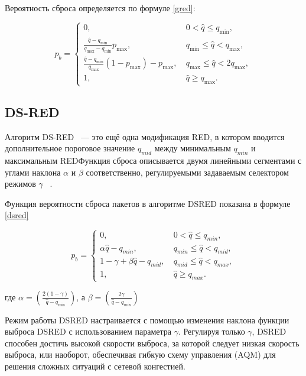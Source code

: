 Вероятность сброса определяется по формуле \eqref{gred}:

\begin{equation}
\label{gred}
p_{b} =\begin{cases}
        0, &  \  0 < \hat{q} \leqslant q_{\min}, 
        \\
        \frac{\hat{q} - q_{\min}}{q_{\max} - q_{\min}} p_{\max}, & \ q_{\min} \leqslant \hat{q} < q_{\max}, 
        \\
        \frac{\hat{q} - q_{\min}}{q_{\max}}(1-p_{\max}) - p_{\max}, & \ q_{\max} \leqslant \hat{q} < 2q_{\max}, 
        \\
        1, &  \ \hat{q} \geqslant  q_{\max}.
\end{cases}
\end{equation}


\subsection{DS-RED}

Алгоритм DS-RED ~--- это ещё одна модификация RED, в котором вводится дополнительное пороговое значение $q_{mid}$ между минимальным $q_{min}$ и максимальным
REDФункция сброса описывается двумя линейными сегментами с углами наклона $\alpha $ и $\beta $ соответственно, регулируемыми
задаваемым селектором режимов $\gamma$ ~\cite{DSRED}. 

Функция вероятности сброса пакетов в алгоритме DSRED показана в формуле \eqref{dsred}

\begin{equation}
\label{dsred}
p_{b} =\begin{cases}
        0, &  \  0 < \hat{q} \leqslant q_{min}, 
        \\
        \alpha{\hat{q} - q_{min}}, & \ q_{min} \leqslant \hat{q} < q_{mid}, 
        \\
        1 - \gamma + \beta{\hat{q} - q_{mid}}, & \ q_{mid} \leqslant \hat{q} < q_{max}, 
        \\
        1, &  \ \hat{q} \geqslant  q_{max}.
\end{cases}
\end{equation}

где $\alpha = (\frac{2(1 - \gamma)}{\hat{q} - q_{\min}})$, а $\beta = (\frac{2\gamma}{\hat{q} - q_{min}})$

Режим работы DSRED настраивается с помощью изменения наклона функции выброса DSRED с использованием параметра $\gamma$. 
Регулируя только $\gamma$, DSRED способен достичь высокой скорости выброса, за которой следует низкая скорость выброса, 
или наоборот, обеспечивая гибкую схему управления (AQM) для решения сложных ситуаций с сетевой конгестией.  

